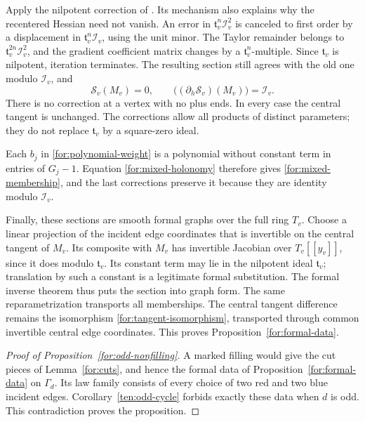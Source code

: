 Apply the nilpotent correction of \cite[Lemma~3.9]{MT}.  Its mechanism
also explains why the recentered Hessian need not vanish.  An error
in $\mathfrak t_v^n\mathcal I_v^2$ is canceled to first order by a
displacement in $\mathfrak t_v^n\mathcal I_v$, using the unit minor.
The Taylor remainder belongs to
$\mathfrak t_v^{2n}\mathcal I_v^2$, and the gradient coefficient
matrix changes by a $\mathfrak t_v^n$-multiple.  Since
$\mathfrak t_v$ is nilpotent, iteration terminates.  The resulting
section still agrees with the old one modulo $\mathcal I_v$, and
\[
 \mathcal S_v(M_v)=0,
 \qquad \bigl((\partial_h\mathcal S_v)(M_v)\bigr)=\mathcal I_v.
\]
There is no correction at a vertex with no plus ends.  In every case
the central tangent is unchanged.  The corrections allow all products
of distinct parameters; they do not replace $\mathfrak t_v$ by a
square-zero ideal.

Each $b_j$ in \eqref{for:polynomial-weight} is a polynomial without
constant term in entries of $G_j-1$.  Equation
\eqref{for:mixed-holonomy} therefore gives
\eqref{for:mixed-membership}, and the last corrections preserve it
because they are identity modulo $\mathcal I_v$.

Finally, these sections are smooth formal graphs over the full ring
$T_v$.  Choose a linear projection of the incident edge coordinates
that is invertible on the central tangent of $M_v$.  Its composite
with $M_v$ has invertible Jacobian over $T_v[[y_v]]$, since it does
modulo $\mathfrak t_v$.  Its constant term may lie in the nilpotent
ideal $\mathfrak t_v$; translation by such a constant is a legitimate
formal substitution.  The formal inverse theorem thus puts the
section into graph form.  The same reparametrization transports all
memberships.  The central tangent difference remains the isomorphism
\eqref{for:tangent-isomorphism}, transported through common invertible
central edge coordinates.  This proves Proposition~\ref{for:formal-data}.

\begin{proof}[Proof of Proposition~\ref{for:odd-nonfilling}]
A marked filling would give the cut pieces of Lemma~\ref{for:cuts},
and hence the formal data of Proposition~\ref{for:formal-data} on
$\Gamma_d$.  Its law family consists of every choice of two red and
two blue incident edges.  Corollary~\ref{ten:odd-cycle} forbids exactly
these data when $d$ is odd.  This contradiction proves the proposition.
\end{proof}
